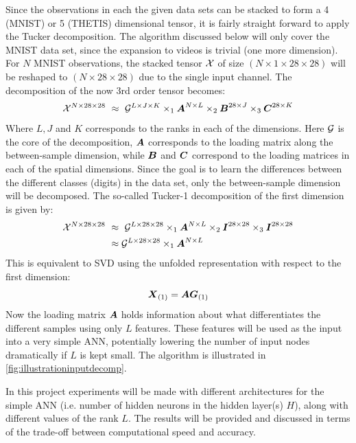 Since the observations in each the given data sets can be stacked to form a 4 (MNIST) or 5 (THETIS) dimensional tensor, it is fairly straight forward to apply the Tucker decomposition. The algorithm discussed below will only cover the MNIST data set, since the expansion to videos is trivial (one more dimension). For $N$ MNIST observations, the stacked tensor $\mathcal{X}$ of size $(N \times 1 \times 28 \times 28)$ will be reshaped to $(N\times 28 \times 28)$ due to the single input channel. The decomposition of the now 3rd order tensor becomes:
\begin{equation}
    \mathcal{X}^{N\times 28 \times 28} \ \approx \  \mathcal{G}^{L\times J \times K} \times_1 \boldsymbol{A}^{N\times L} \times_2 \boldsymbol{B}^{28 \times J} \times_3 \boldsymbol{C}^{28 \times K}
\end{equation}
Where $L, J$ and $K$ corresponds to the ranks in each of the dimensions. Here $\mathcal{G}$ is the core of the decomposition, $\boldsymbol{A}$ corresponds to the loading matrix along the between-sample dimension, while $\boldsymbol{B}$ and $\boldsymbol{C}$ correspond to the loading matrices in each of the spatial dimensions. Since the goal is to learn the differences between the different classes (digits) in the data set, only the between-sample dimension will be decomposed. The so-called Tucker-1 decomposition of the first dimension is given by:
\begin{align}
    \mathcal{X}^{N\times 28 \times 28} \ &\approx \  \mathcal{G}^{L\times 28 \times 28} \times_1 \boldsymbol{A}^{N\times L} \times_2 \boldsymbol{I}^{28 \times 28} \times_3 \boldsymbol{I}^{28 \times 28} \\
    &\approx \mathcal{G}^{L\times 28 \times 28} \times_1 \boldsymbol{A}^{N\times L}
\end{align}
This is equivalent to SVD using the unfolded representation with respect to the first dimension:
\begin{equation}
    \boldsymbol{X}_{(1)} = \boldsymbol{A} \boldsymbol{G}_{(1)}
    \label{eq:tuckerMNISTinput}
\end{equation}
Now the loading matrix $\boldsymbol{A}$ holds information about what differentiates the different samples using only $L$ features. These features will be used as the input into a very simple ANN, potentially lowering the number of input nodes dramatically if $L$ is kept small. The algorithm is illustrated in \autoref{fig:illustrationinputdecomp}.

In this project experiments will be made with different architectures for the simple ANN (i.e. number of hidden neurons in the hidden layer(s) $H$), along with different values of the rank $L$. The results will be provided and discussed in terms of the trade-off between computational speed and accuracy.

